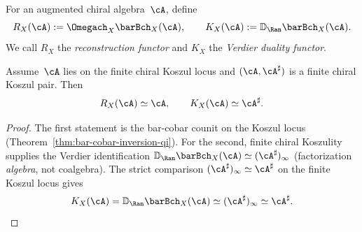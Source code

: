 \begin{definition}
\label{def:reconstruction-vs-duality-functors}
For an augmented chiral algebra~$\cA$, define
\[
R_X(\cA) := \Omegach_X \barBch_X(\cA),
\qquad
K_X(\cA) := \mathbb{D}_{\Ran}\barBch_X(\cA).
\]
We call $R_X$ the \emph{reconstruction functor} and $K_X$ the
\emph{Verdier duality functor}.
\end{definition}

\begin{theorem}
\label{thm:reconstruction-vs-duality}
Assume~$\cA$ lies on the finite chiral Koszul locus and
$(\cA, \cA^\sharp)$ is a finite chiral Koszul pair. Then
\[
R_X(\cA) \simeq \cA,
\qquad
K_X(\cA) \simeq \cA^\sharp.
\]
\end{theorem}

\begin{proof}
The first statement is the bar-cobar counit on the Koszul locus
(Theorem~\ref{thm:bar-cobar-inversion-qi}).
For the second, finite chiral Koszulity supplies the Verdier
identification
$\mathbb{D}_{\Ran}\barBch_X(\cA) \simeq (\cA^\sharp)_\infty$ (factorization \emph{algebra}, not coalgebra).
The strict comparison $(\cA^\sharp)_\infty \simeq \cA^\sharp$ on the
finite Koszul locus gives
\[
K_X(\cA)
= \mathbb{D}_{\Ran}\barBch_X(\cA)
\simeq (\cA^\sharp)_\infty
\simeq \cA^\sharp.
\qedhere
\]
\end{proof}

